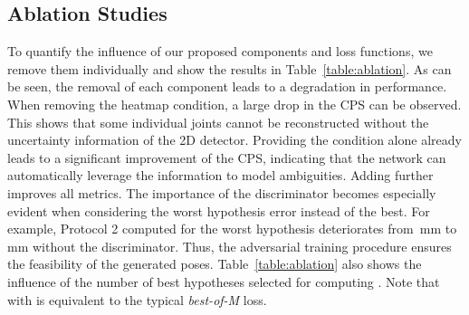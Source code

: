 \documentclass[10pt,twocolumn,letterpaper]{article}
\begin{document}
\subsection{Ablation Studies} \label{sec:ablations}
To quantify the influence of our proposed components and loss functions, we remove them individually and show the results in Table~\ref{table:ablation}.
As can be seen, the removal of each component leads to a degradation in performance.
When removing the heatmap condition, a large drop in the CPS can be observed.
This shows that some individual joints cannot be reconstructed without the uncertainty information of the 2D detector.
Providing the condition alone already leads to a significant improvement of the CPS, indicating that the network can automatically leverage the information to model ambiguities.
Adding  further improves all metrics.
The importance of the discriminator becomes especially evident when considering the worst hypothesis error instead of the best.
For example, Protocol 2 computed for the worst hypothesis deteriorates from \,mm to \,mm without the discriminator.
Thus, the adversarial training procedure ensures the feasibility of the generated poses.
Table~\ref{table:ablation} also shows the influence of the number of best hypotheses  selected for computing . Note that  with  is equivalent to the typical \textit{best-of-M} loss.

\begin{table}
\begin{center}
    \caption{Ablation studies on the subset H36MA.}
    \vspace{-1.5em}
    \label{table:ablation}
\end{center}
\end{table}
\end{document}
